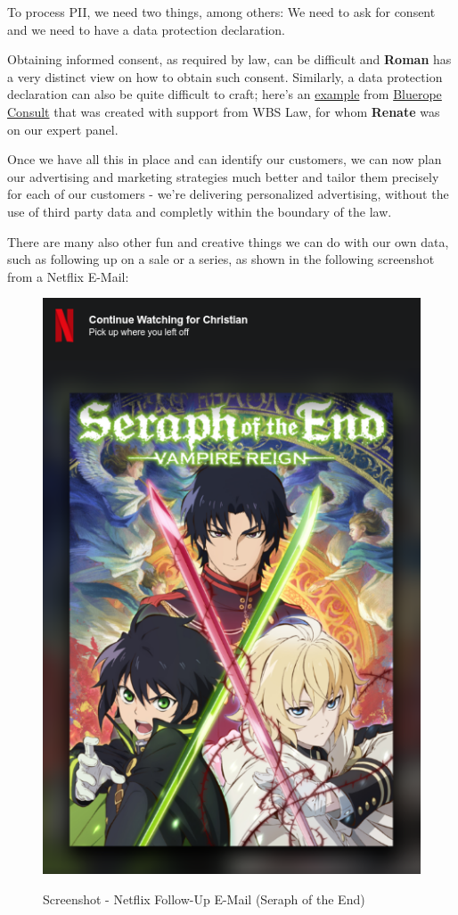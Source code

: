 To process PII, we need two things, among others: We need to ask for consent and we need to have a data protection declaration.

Obtaining informed consent, as required by law, can be difficult and \textbf{Roman} has a very distinct view on how to obtain such consent. Similarly, a data protection declaration can also be quite difficult to craft; here's an \href{https://blueropeconsultonline.de/datenschutz/}{example} from \href{https://blueropeconsultonline.de/}{Bluerope Consult} that was created with support from WBS Law, for whom \textbf{Renate} was on our expert panel.

Once we have all this in place and can identify our customers, we can now plan our advertising and marketing strategies much better and tailor them precisely for each of our customers - we're delivering personalized advertising, without the use of third party data and completly within the boundary of the law.

There are many also other fun and creative things we can do with our own data, such as following up on a sale or a series, as shown in the following screenshot from a Netflix E-Mail:

\begin{figure}[H]
\centering
\caption {Screenshot - Netflix Follow-Up E-Mail (Seraph of the End)}
\includegraphics[scale=0.6]{images/continue-seraph.png}
\label{fig:seraph}
\end{figure}

